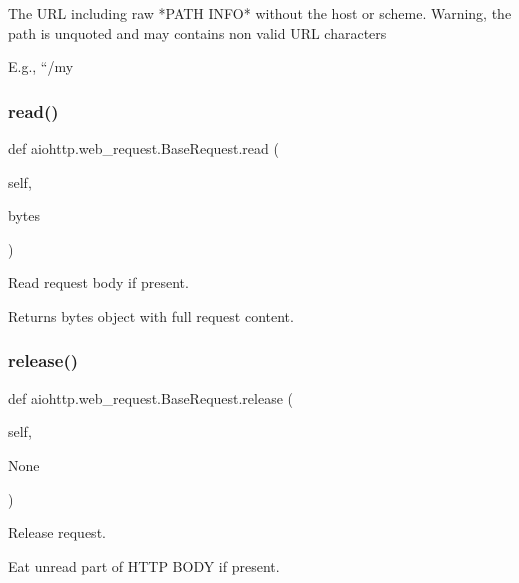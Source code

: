 \begin{DoxyVerb}The URL including raw *PATH INFO* without the host or scheme.
Warning, the path is unquoted and may contains non valid URL characters

E.g., ``/my%
\end{DoxyVerb}
 \mbox{\label{classaiohttp_1_1web__request_1_1_base_request_aec044fb1ddaa3c00a8c39d97430e4ad4}} 
\subsubsection{\texorpdfstring{read()}{read()}}
{\footnotesize\ttfamily def aiohttp.\+web\+\_\+request.\+Base\+Request.\+read (\begin{DoxyParamCaption}\item[{}]{self,  }\item[{}]{bytes }\end{DoxyParamCaption})}

\begin{DoxyVerb}Read request body if present.

Returns bytes object with full request content.
\end{DoxyVerb}
 \mbox{\label{classaiohttp_1_1web__request_1_1_base_request_a34b2346a1b3ec37a90d36779e98d56ce}} 
\subsubsection{\texorpdfstring{release()}{release()}}
{\footnotesize\ttfamily def aiohttp.\+web\+\_\+request.\+Base\+Request.\+release (\begin{DoxyParamCaption}\item[{}]{self,  }\item[{}]{None }\end{DoxyParamCaption})}

\begin{DoxyVerb}Release request.

Eat unread part of HTTP BODY if present.
\end{DoxyVerb}
 \mbox{\label{classaiohttp_1_1web__request_1_1_base_request_a004b797508d01c804f7dea392ecc5e93}} 
